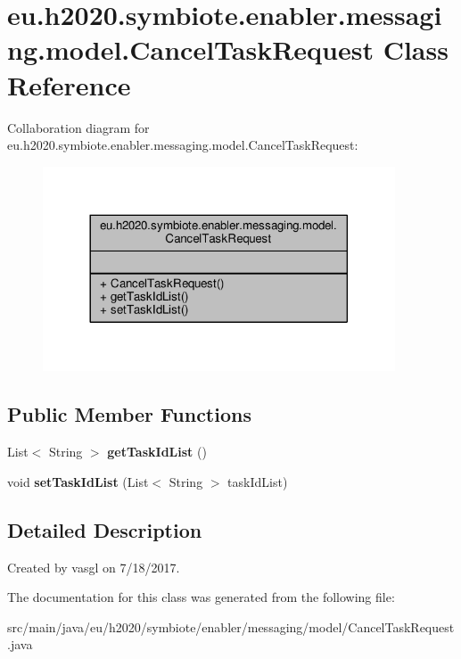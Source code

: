 \hypertarget{classeu_1_1h2020_1_1symbiote_1_1enabler_1_1messaging_1_1model_1_1CancelTaskRequest}{}\section{eu.\+h2020.\+symbiote.\+enabler.\+messaging.\+model.\+Cancel\+Task\+Request Class Reference}
\label{classeu_1_1h2020_1_1symbiote_1_1enabler_1_1messaging_1_1model_1_1CancelTaskRequest}


Collaboration diagram for eu.\+h2020.\+symbiote.\+enabler.\+messaging.\+model.\+Cancel\+Task\+Request\+:\nopagebreak
\begin{figure}[H]
\begin{center}
\leavevmode
\includegraphics[width=296pt]{classeu_1_1h2020_1_1symbiote_1_1enabler_1_1messaging_1_1model_1_1CancelTaskRequest__coll__graph}
\end{center}
\end{figure}
\subsection*{Public Member Functions}
\begin{DoxyCompactItemize}
\item 
\mbox{\label{classeu_1_1h2020_1_1symbiote_1_1enabler_1_1messaging_1_1model_1_1CancelTaskRequest_abbc53a13b031cc08ee2d11f8fd5dce2e}} 
List$<$ String $>$ {\bfseries get\+Task\+Id\+List} ()
\item 
\mbox{\label{classeu_1_1h2020_1_1symbiote_1_1enabler_1_1messaging_1_1model_1_1CancelTaskRequest_ac2f07d5070cdff8b76e643b91d352331}} 
void {\bfseries set\+Task\+Id\+List} (List$<$ String $>$ task\+Id\+List)
\end{DoxyCompactItemize}


\subsection{Detailed Description}
Created by vasgl on 7/18/2017. 

The documentation for this class was generated from the following file\+:\begin{DoxyCompactItemize}
\item 
src/main/java/eu/h2020/symbiote/enabler/messaging/model/Cancel\+Task\+Request.\+java\end{DoxyCompactItemize}
